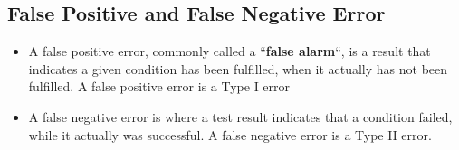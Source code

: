 \documentclass[a4paper,12pt]{article}
\begin{document}
\subsection*{False Positive and False Negative Error}

\begin{itemize}
	\item 
	A false positive error, commonly called a ``\textbf{false alarm}``, is a result that indicates
	a given condition has been fulfilled, when it actually has not been
	fulfilled. A false positive error is a Type I error %
	\item  A false negative error is where a test result indicates that a condition
	failed, while it actually was successful. A false negative error is a Type II
	error.%
\end{itemize}
\end{document}

